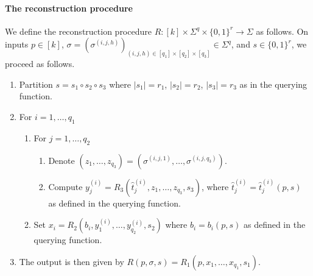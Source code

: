 \paragraph{The reconstruction procedure}
We define the reconstruction procedure $R:[k]\times\Sigma^q\times\{0,1\}^r\to\Sigma$ as follows. On inputs $p\in[k]$, $\sigma=(\sigma^{(i,j,h)})_{(i,j,h)\in[q_1]\times[q_2]\times[q_3]}\in\Sigma^q$, and $s\in\{0,1\}^r$, we proceed as follows.
\begin{enumerate}
\item Partition $s=s_1\circ s_2\circ s_3$ where $|s_1|=r_1$, $|s_2|=r_2$, $|s_3|=r_3$ as in the querying function.
\item For $i=1,\ldots,q_1$
\begin{enumerate}
\item For $j=1,\ldots,q_2$
\begin{enumerate}
\item Denote $(z_1,\ldots,z_{q_3})=(\sigma^{(i,j,1)},\ldots,\sigma^{(i,j,q_3)})$.
\item Compute $y_j^{(i)}=R_3(\widehat t_j^{(i)},z_1,\ldots,z_{q_3},s_3)$, where $\widehat t_j^{(i)}=\widehat t_j^{(i)}(p,s)$ as defined in the querying function.
\end{enumerate}
\item Set $x_i=R_2(b_i,y_1^{(i)},\ldots,y_{q_2}^{(i)},s_2)$ where $b_i=b_i(p,s)$ as defined in the querying function.
\end{enumerate}
\item The output is then given by $R(p,\sigma,s)=R_1(p,x_1,\ldots,x_{q_1},s_1)$.
\end{enumerate}
